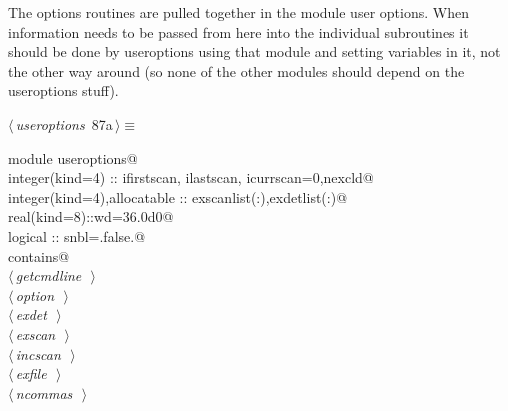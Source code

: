 \documentclass[10pt,a4paper,notitlepage]{article}
\begin{document}
\begin{flushleft}
\begin{minipage}{\linewidth}
\begin{list}{}{\setlength{\itemsep}{-\parsep}\setlength{\itemindent}{-\leftmargin}}
\item{}
\end{list}
\end{minipage}\vspace{4ex}
\end{flushleft}
The options routines are pulled together in the module user options.
When information needs to be passed from here into the individual
subroutines it should be done by useroptions using that module
and setting variables in it, not the other way around (so none
of the other modules should depend on the useroptions stuff).


\begin{flushleft} \small
\begin{minipage}{\linewidth}\label{scrap110}\raggedright\small
{} $\langle\,${\it useroptions}\nobreak\ {\footnotesize {87a}}$\,\rangle\equiv$
\vspace{-1ex}
\begin{list}{}{} \item
\mbox{}\verb@      module useroptions@\\
\mbox{}\verb@      integer(kind=4) :: ifirstscan, ilastscan, icurrscan=0,nexcld@\\
\mbox{}\verb@      integer(kind=4),allocatable :: exscanlist(:),exdetlist(:)@\\
\mbox{}\verb@      real(kind=8)::wd=36.0d0@\\
\mbox{}\verb@      logical :: snbl=.false.@\\
\mbox{}\verb@      contains@\\
\mbox{}\verb@@\hbox{$\langle\,${\it getcmdline}\nobreak\ {\footnotesize {}}$\,\rangle$}\verb@@\\
\mbox{}\verb@@\hbox{$\langle\,${\it option}\nobreak\ {\footnotesize {}}$\,\rangle$}\verb@@\\
\mbox{}\verb@@\hbox{$\langle\,${\it exdet}\nobreak\ {\footnotesize {}}$\,\rangle$}\verb@@\\
\mbox{}\verb@@\hbox{$\langle\,${\it exscan}\nobreak\ {\footnotesize {}}$\,\rangle$}\verb@@\\
\mbox{}\verb@@\hbox{$\langle\,${\it incscan}\nobreak\ {\footnotesize {}}$\,\rangle$}\verb@@\\
\mbox{}\verb@@\hbox{$\langle\,${\it exfile}\nobreak\ {\footnotesize {}}$\,\rangle$}\verb@@\\
\mbox{}\verb@@\hbox{$\langle\,${\it ncommas}\nobreak\ {\footnotesize {}}$\,\rangle$}\verb@@\\

\end{list}
\end{minipage}
\end{flushleft}
\end{document}
